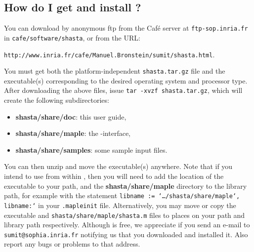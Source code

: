 \subsection{How do I get and install \shasta?}
You can download \shasta{} by anonymous ftp from the {\sc Caf\'e} server at
{\tt ftp-sop.inria.fr} in {\tt cafe/software/shasta},
or from the URL:\\
\vspace{-2mm}
\begin{center}
{\tt http://www.inria.fr/cafe/Manuel.Bronstein/sumit/shasta.html}.
\end{center}
You must get both the platform-independent {\tt shasta.tar.gz} file
and the executable(s) corresponding to the desired operating system and
processor type.
After downloading the above files, issue
{\tt tar -xvzf shasta.tar.gz},
which will create the following subdirectories:
\begin{itemize}
\item{\bf shasta/share/doc}: this user guide,
\item{\bf shasta/share/maple}: the \shasta-\maple interface,
\item{\bf shasta/share/samples}: some sample \shasta{} input files.
\end{itemize}
You can then unzip and move the executable(s) anywhere. Note that
if you intend to use \shasta{} from within \maple, then you will need
to add the location of the \shasta{} executable to your path,
and the {\bf shasta/share/maple} directory to the \maple{} library path,
for example with the statement
{\tt libname := `\dots/shasta/share/maple`, libname:`} in your
{\tt .mapleinit} file. Alternatively,
you may move or copy the executable and {\tt shasta/share/maple/shasta.m} files
to places on your path and \maple{} library path respectively.
Although \shasta{} is free, we appreciate if you send an e-mail to
{\tt sumit@sophia.inria.fr} notifying us that you downloaded and
installed it. Also report any bugs or problems to that address.
